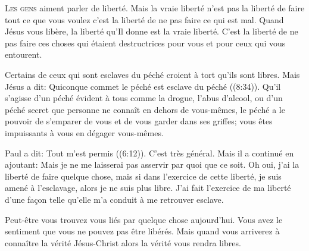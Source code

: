 

\lettrine{L}{es gens} aiment parler de liberté.
 Mais la vraie liberté n'est pas la liberté de faire tout ce que vous voulez
 \ocadr c'est la liberté de ne pas faire ce qui est mal.
 Quand Jésus vous libère, la liberté qu'Il donne est la vraie liberté.
 C'est la liberté de ne pas faire ces choses qui étaient destructrices
 pour vous et pour ceux qui vous entourent.

Certains de ceux qui sont esclaves du péché croient à tort qu'ils sont libres.
 Mais Jésus a dit: 
 \Og Quiconque commet le péché est esclave du péché \Fg{}
 ((8:34)). Qu'il s'agisse d'un péché évident à tous
 comme la drogue, l'abus d'alcool, ou d'un péché secret que personne
 ne connaît en dehors de vous-mêmes, le péché a le pouvoir de s'emparer
 de vous et de vous garder dans ses griffes;
 vous êtes impuissants à vous en dégager vous-mêmes.


Paul a dit: 
 \Og Tout m'est permis \Fg{} ((6:12)).
 C'est très général. Mais il a continué en ajoutant: 
 \Og Mais je ne me laisserai pas asservir par quoi que ce soit. \Fg{}
 Oh oui, j'ai la liberté de faire quelque chose, mais si dans l'exercice
 de cette liberté, je suis amené à l'esclavage, alors je ne suis plus libre.
 J'ai fait l'exercice de ma liberté d'une fa\c{c}on telle qu'elle m'a conduit
 à me retrouver esclave.

Peut-être vous trouvez vous liés par quelque chose aujourd'hui.
 Vous avez le sentiment que vous ne pouvez pas être libérés.
 Mais quand vous arriverez à connaître la vérité
 \ocadr Jésus-Christ \fcadr{} alors la vérité vous rendra libres.

\dvrule





